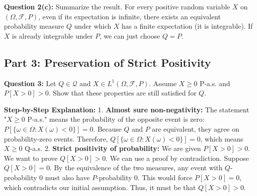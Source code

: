 \textbf{Question 2(c):} Summarize the result.
For every positive random variable $X$ on $(\Omega, \mathcal{F}, P)$, even if its expectation is infinite, there exists an equivalent probability measure $Q$ under which $X$ has a finite expectation (it is integrable). If $X$ is already integrable under $P$, we can just choose $Q = P$.

\subsection{Part 3: Preservation of Strict Positivity}

\textbf{Question 3:} Let $Q \in \mathcal{Q}$ and $X \in L^1(\Omega, \mathcal{F}, P)$. Assume $X \ge 0$ P-a.s. and $P[X > 0] > 0$. Show that these properties are still satisfied for $Q$.

\textbf{Step-by-Step Explanation:}
1. \textbf{Almost sure non-negativity:} The statement "$X \ge 0$ P-a.s." means the probability of the opposite event is zero: $P[\{\omega \in \Omega : X(\omega) < 0\}] = 0$. Because $Q$ and $P$ are equivalent, they agree on probability-zero events. Therefore, $Q[\{\omega \in \Omega : X(\omega) < 0\}] = 0$, which means $X \ge 0$ Q-a.s.
2. \textbf{Strict positivity of probability:} We are given $P[X > 0] > 0$. We want to prove $Q[X > 0] > 0$. We can use a proof by contradiction. Suppose $Q[X > 0] = 0$. By the equivalence of the two measures, any event with $Q$-probability 0 must also have $P$-probability 0. This would force $P[X > 0] = 0$, which contradicts our initial assumption. Thus, it must be that $Q[X > 0] > 0$.